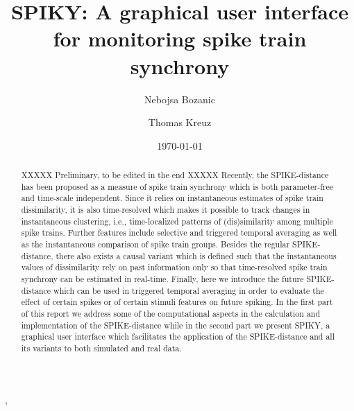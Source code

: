 \documentclass[10pt,twocolumn]{elsart5p}
\begin{document}
\begin{frontmatter}

\title{SPIKY: A graphical user interface for monitoring spike train synchrony}

\author{Nebojsa Bozanic},
\author{Thomas Kreuz}


\address{Institute for complex systems, CNR, Sesto Fiorentino, Italy}


\date{\today}

\begin{abstract}

XXXXX Preliminary, to be edited in the end XXXXX
Recently, the SPIKE-distance has been proposed as a measure of spike train synchrony which is both parameter-free and time-scale independent. Since it relies on instantaneous estimates of spike train dissimilarity, it is also time-resolved which makes it possible to track changes in instantaneous clustering, i.e., time-localized patterns of (dis)similarity among multiple spike trains. Further features include selective and triggered temporal averaging as well as the instantaneous comparison of spike train groups. Besides the regular SPIKE-distance, there also exists a causal variant which is defined such that the instantaneous values of dissimilarity rely on past information only so that time-resolved spike train synchrony can be estimated in real-time. Finally, here we introduce the future SPIKE-distance which can be used in triggered temporal averaging in order to evaluate the effect of certain spikes or of certain stimuli features on future spiking. In the first part of this report we address some of the computational aspects in the calculation and implementation of the SPIKE-distance while in the second part we present SPIKY, a graphical user interface which facilitates the application of the SPIKE-distance and all its variants to both simulated and real data.
 
\end{abstract}



\end{frontmatter}

\newcommand{\abb}{\small\sf}

%
%
%
%
\end{document}
